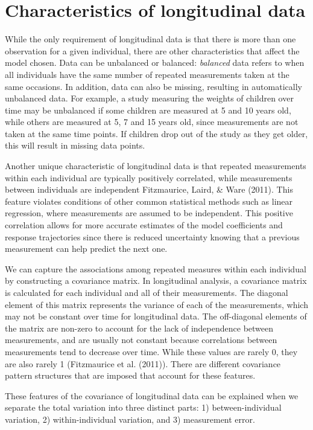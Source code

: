 \documentclass[12pt, twoside]{amherstthesis}
\begin{document}
\hypertarget{characteristics-of-longitudinal-data}{%
\section{Characteristics of longitudinal data}\label{characteristics-of-longitudinal-data}}

While the only requirement of longitudinal data is that there is more than one observation for a given individual, there are other characteristics that affect the model chosen. Data can be unbalanced or balanced: \emph{balanced} data refers to when all individuals have the same number of repeated measurements taken at the same occasions. In addition, data can also be missing, resulting in automatically unbalanced data. For example, a study measuring the weights of children over time may be unbalanced if some children are measured at 5 and 10 years old, while others are measured at 5, 7 and 15 years old, since measurements are not taken at the same time points. If children drop out of the study as they get older, this will result in missing data points.

Another unique characteristic of longitudinal data is that repeated measurements within each individual are typically positively correlated, while measurements between individuals are independent Fitzmaurice, Laird, \& Ware (2011). This feature violates conditions of other common statistical methods such as linear regression, where measurements are assumed to be independent. This positive correlation allows for more accurate estimates of the model coefficients and response trajectories since there is reduced uncertainty knowing that a previous measurement can help predict the next one.

We can capture the associations among repeated measures within each individual by constructing a covariance matrix. In longitudinal analysis, a covariance matrix is calculated for each individual and all of their measurements. The diagonal element of this matrix represents the variance of each of the measurements, which may not be constant over time for longitudinal data. The off-diagonal elements of the matrix are non-zero to account for the lack of independence between measurements, and are usually not constant because correlations between measurements tend to decrease over time. While these values are rarely 0, they are also rarely 1 (Fitzmaurice et al. (2011)). There are different covariance pattern structures that are imposed that account for these features.

These features of the covariance of longitudinal data can be explained when we separate the total variation into three distinct parts: 1) between-individual variation, 2) within-individual variation, and 3) measurement error.
\end{document}
